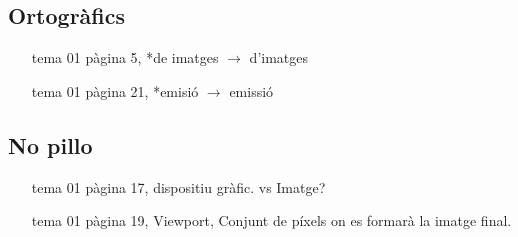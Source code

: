 \subsection{Ortogràfics}
\begin{itemize}
    \item[tema 01] pàgina 5, *de imatges $\to$ d'imatges
    \item[tema 01] pàgina 21, *emisió $\to$ emissió
\end{itemize}

\subsection{No pillo}
\begin{itemize}
    \item[tema 01] pàgina 17, dispositiu gràfic. vs Imatge?
    \item[tema 01] pàgina 19, Viewport, Conjunt de píxels on es formarà la imatge final.
\end{itemize}